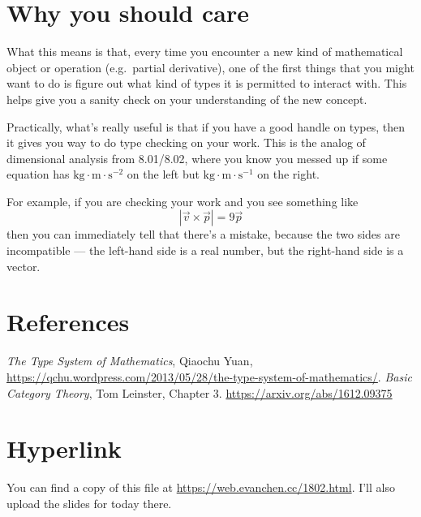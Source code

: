 \documentclass[11pt]{scrartcl}
\begin{document}
\section*{Why you should care}
What this means is that, every time you encounter a new kind of
mathematical object or operation (e.g.\ partial derivative),
one of the first things that you might want to do is figure out
what kind of types it is permitted to interact with.
This helps give you a sanity check on your understanding of the new concept.

Practically, what's really useful is that if you have a good handle on types,
then it gives you way to do \alert{type checking} on your work.
This is the analog of dimensional analysis from 8.01/8.02, where
you know you messed up if some equation has
$\text{kg} \cdot \text{m} \cdot \text{s}^{-2}$ on the left but
$\text{kg} \cdot \text{m} \cdot \text{s}^{-1}$ on the right.

For example, if you are checking your work and you see something like
\[ \left\lvert \vec v \times \vec p \right\rvert = 9 \vec p \]
then you can immediately tell that there's a mistake,
because the two sides are incompatible --- the left-hand side is a real number,
but the right-hand side is a vector.

\section*{References}
\begin{itemize}
  \ii \emph{The Type System of Mathematics}, Qiaochu Yuan,
  \url{https://qchu.wordpress.com/2013/05/28/the-type-system-of-mathematics/}.
  \ii \emph{Basic Category Theory}, Tom Leinster, Chapter 3.
  \url{https://arxiv.org/abs/1612.09375}
\end{itemize}

\section*{Hyperlink}
You can find a copy of this file at
\url{https://web.evanchen.cc/1802.html}.
I'll also upload the slides for today there.
\end{document}
